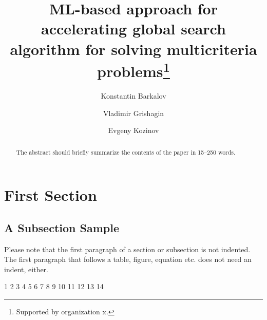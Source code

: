 \documentclass[runningheads]{llncs}
\begin{document}
%
\title{ML-based approach for accelerating global search algorithm for solving multicriteria problems\thanks{Supported by organization x.}}
%
%
\author{Konstantin Barkalov \and
Vladimir Grishagin \and
Evgeny Kozinov}
%
%
%
\maketitle              %
%
\begin{abstract}
The abstract should briefly summarize the contents of the paper in
15--250 words.

\end{abstract}
%
%
%
\section{First Section}
\subsection{A Subsection Sample}
Please note that the first paragraph of a section or subsection is
not indented. The first paragraph that follows a table, figure,
equation etc. does not need an indent, either.

1 \cite{Miettinen1999}
2 \cite{Ehrgott2005}
3 \cite{Pardalos2017}
4 \cite{Strongin2000}
5 \cite{Sergeyev2013}
6 \cite{GergelKozinovAPI2016}
7 \cite{Gergel2018}
8 \cite{Marler2004}
9 \cite{GergelKozinov2020}
10 \cite{Yu2011}
11 \cite{globalizerSystem}
12 \cite{Evtushenko2014}
13 \cite{Zilinskas2015}
14 \cite{PISA2003}

%
%
%
% 
% 
%


\end{document}
